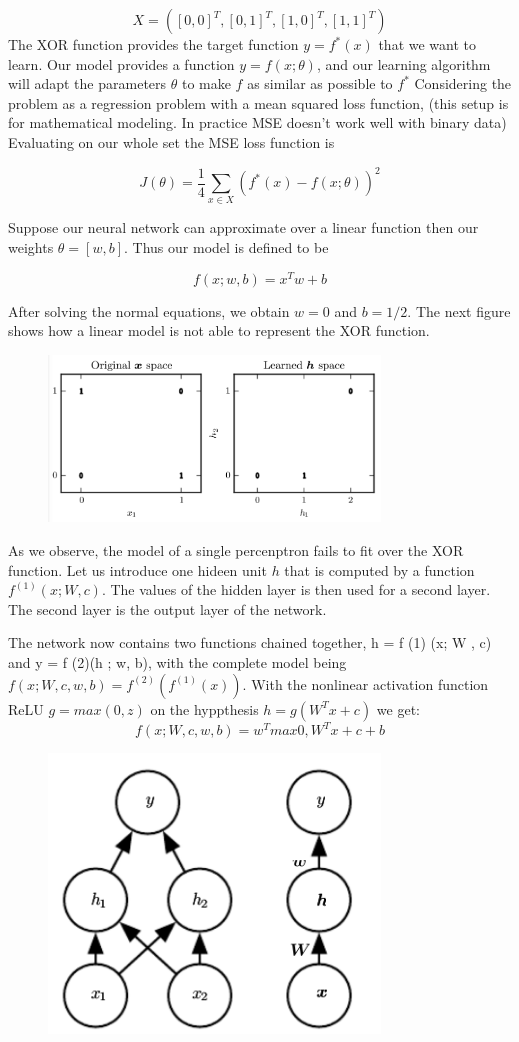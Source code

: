\documentclass{report}
\begin{document}
$$X = ([0, 0]^T, [0,1]^T,[1, 0]^T,[1, 1]^T)$$
The XOR function provides the target function
$y = f^\ast(x)$ that we want to learn. Our model provides a function $y = f(x;\theta)$, and our learning algorithm will adapt the parameters $\theta$ to make $f$ as similar as possible to $f^\ast$ Considering the problem as a regression problem with a mean squared loss function, (this setup is for mathematical modeling. In practice MSE doesn't work well with binary data) Evaluating on our whole set the MSE loss function is

$$J(\theta) = \frac{1}{4}\sum_{x\in X}(f^\ast(x) - f(x;\theta))^2$$

Suppose our neural network can approximate over a linear function then our weights $\theta = [w,b]$. Thus our model is defined to be

$$f(x;w,b) = x^Tw + b$$

After solving the normal equations, we obtain $w = 0$ and $b=1/2$. The next figure shows how a linear model is not able to represent the XOR function.

\begin{figure}[ht]
	\includegraphics[width=250pt]{6}
	\centering
\end{figure}
As we observe, the model of a single percenptron fails to fit over the XOR function. Let us introduce one hideen unit $h$ that is computed by a function $f^{(1)}(x;W,c)$. The values of the hidden layer is then used for a second layer. The second layer is the output layer of the network.

The network now contains two functions chained together, h = f (1) (x; W , c) and y = f (2)(h ; w, b), with the complete model being $f(x; W , c, w , b) = f^{(2)} (f^{(1)}(x))$. With the nonlinear activation function ReLU $g = max(0,z)$ on the hyppthesis $h= g(W^Tx + c)$ we get:
$$f(x;W, c,w, b) = w^T max{0,W^Tx + c} + b$$


\begin{figure}[ht]
	\includegraphics[width=250pt]{7}
	\centering
\end{figure}
\end{document}

